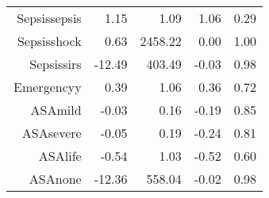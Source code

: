 \begin{tabular}{rrrrr}
$$  Sepsis\-sepsis & 1.15 & 1.09 & 1.06 & 0.29 \\ 
  Sepsis\-shock & 0.63 & 2458.22 & 0.00 & 1.00 \\ 
  Sepsis\-sirs & -12.49 & 403.49 & -0.03 & 0.98 \\ 
  Emergency\-y & 0.39 & 1.06 & 0.36 & 0.72 \\ 
  ASA\-mild & -0.03 & 0.16 & -0.19 & 0.85 \\ 
  ASA\-severe & -0.05 & 0.19 & -0.24 & 0.81 \\ 
  ASA\-life & -0.54 & 1.03 & -0.52 & 0.60 \\ 
  ASA\-none & -12.36 & 558.04 & -0.02 & 0.98 \\ 
   \hline
\end{tabular}

